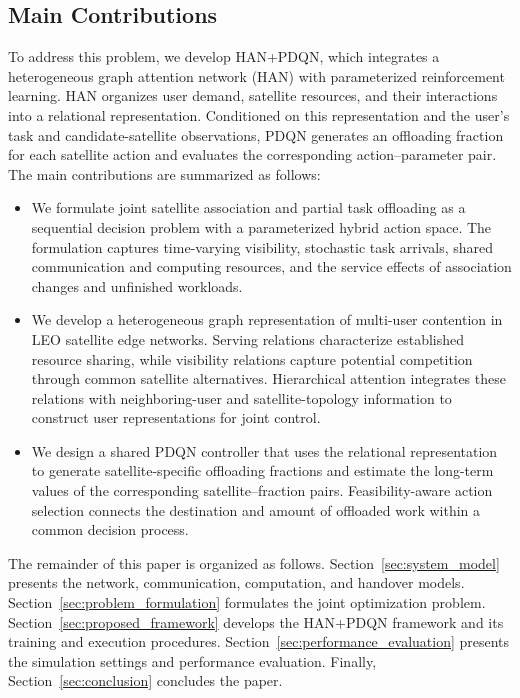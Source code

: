 \documentclass[journal]{IEEEtran}
\begin{document}
\subsection{Main Contributions}

To address this problem, we develop HAN+PDQN, which
integrates a heterogeneous graph attention network (HAN)
with parameterized reinforcement learning.
HAN organizes user demand, satellite resources, and
their interactions into a relational representation.
Conditioned on this representation and the user's
task and candidate-satellite observations, PDQN generates
an offloading fraction for each satellite action and
evaluates the corresponding action--parameter pair.
The main contributions are summarized as follows:

\begin{itemize}
    \item We formulate joint satellite association and
    partial task offloading as a sequential decision
    problem with a parameterized hybrid action space.
    The formulation captures time-varying visibility,
    stochastic task arrivals, shared communication and
    computing resources, and the service effects of
    association changes and unfinished workloads.

    \item We develop a heterogeneous graph representation
    of multi-user contention in LEO satellite edge
    networks.
    Serving relations characterize established resource
    sharing, while visibility relations capture potential
    competition through common satellite alternatives.
    Hierarchical attention integrates these relations
    with neighboring-user and satellite-topology
    information to construct user representations
    for joint control.

    \item We design a shared PDQN controller that uses
    the relational representation to generate
    satellite-specific offloading fractions and
    estimate the long-term values of the corresponding
    satellite--fraction pairs.
    Feasibility-aware action selection connects the
    destination and amount of offloaded work within
    a common decision process.
\end{itemize}

The remainder of this paper is organized as follows.
Section~\ref{sec:system_model} presents the network,
communication, computation, and handover models.
Section~\ref{sec:problem_formulation} formulates the
joint optimization problem.
Section~\ref{sec:proposed_framework} develops the
HAN+PDQN framework and its training and execution
procedures.
Section~\ref{sec:performance_evaluation} presents
the simulation settings and performance evaluation.
Finally, Section~\ref{sec:conclusion} concludes the paper.
\end{document}
